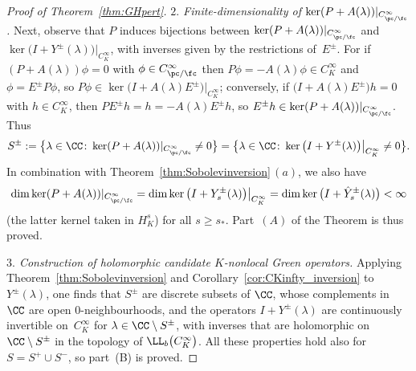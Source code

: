 \begin{proof}[Proof of Theorem~\ref{thm:GHpert}]
 	\emph{$2.$ Finite-dimensionality of $\ker (P+ A(\lambda))|_{C^\infty_{\pc/\fc}}$.} Next, observe that $P$ induces bijections between $\ker (P+ A(\lambda))|_{C^\infty_{\pc/\fc}}$ and $\ker \big(I+ Y^{\pm}(\lambda)\big)\big|_{C^\infty_K}$,
 	with inverses given by the restrictions of~$E^{\pm}$. For
 	if $(P+ A(\lambda))\phi=0$ with $\phi\in C^\infty_{\pc/\fc}$ then
 	$P\phi=- A(\lambda)\phi\in C^\infty_K$ and $\phi=E^\pm P\phi$, so $P\phi\in\ker\big(I+ A(\lambda)E^\pm\big)\big|_{C^\infty_K}$; conversely, if $\big(I+ A(\lambda)E^\pm\big)h=0$ with
 	$h\in C^\infty_K$, then $PE^\pm h = h=- A(\lambda)E^\pm h$, so
 	$E^\pm h\in \ker(P+ A(\lambda))|_{C^\infty_{\pc/\fc}}$.
 	Thus
 	\begin{equation*}
 		S^\pm:= \big\{\lambda\in \CC\colon \ker (P+ A(\lambda))|_{C^\infty_{\pc/\fc}}\neq 0\big\}= \big\{\lambda\in \CC\colon \ker \big(I+ Y^{\pm}(\lambda)\big)\big|_{C^\infty_K}\neq 0\big\}.
 	\end{equation*}
 	In combination with Theorem~\ref{thm:Sobolevinversion}\,$(a)$, we also have
 	\begin{equation}\label{eq:GHpert_remark}
 		\dim \ker (P+A(\lambda))|_{C^\infty_{\pc/\fc}} = \dim \ker \big(I+Y_s^{\pm}(\lambda)\big)\big|_{C^\infty_{K}} = \dim \ker \big(I+\hat{Y}_s^{\pm}(\lambda)\big)<\infty
 	\end{equation}
 	\big(the latter kernel taken in $H^s_K$\big) for all $s\ge s_*$. Part~$(A)$ of the Theorem is thus proved.
 	
 	\emph{$3.$ Construction of holomorphic candidate $K$-nonlocal Green operators.} Applying Theorem~\ref{thm:Sobolevinversion} and Corollary~\ref{cor:CKinfty_inversion} to $Y^\pm(\lambda)$, one finds that $S^\pm$ are discrete subsets of $\CC$, whose complements in~$\CC$ are open $0$-neighbourhoods, and the operators $I+ Y^\pm(\lambda)$ are continuously invertible on~$C^\infty_K$ for $\lambda\in\CC\setminus S^\pm$, with inverses
 	that are holomorphic on~$\CC\setminus S^\pm$ in the topology
 	of $\LL_b\big(C^\infty_K\big)$. All these properties hold also for $S=S^+\cup S^-$,
 	so part~(B) is proved.
 	

\end{proof}
